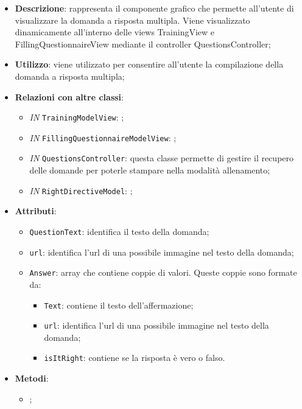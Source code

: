 		\begin{itemize}
			\item \textbf{Descrizione}: rappresenta il componente grafico che permette all'utente di visualizzare la domanda a risposta multipla. Viene visualizzato dinamicamente all'interno delle views TrainingView e FillingQuestionnaireView mediante il controller QuestionsController;
			\item \textbf{Utilizzo}: viene utilizzato per consentire all'utente la compilazione della domanda a risposta multipla;
			\item \textbf{Relazioni con altre classi}: 
			\begin{itemize}
				\item \textit{IN} \texttt{TrainingModelView}: ; 
				\item \textit{IN} \texttt{FillingQuestionnaireModelView}: ;
				\item \textit{IN} \texttt{QuestionsController}: questa classe permette di gestire il recupero delle domande per poterle stampare nella modalità allenamento;
				\item \textit{IN} \texttt{RightDirectiveModel}: ;
			\end{itemize}
			\item \textbf{Attributi}: 
			\begin{itemize}
				\item \texttt{QuestionText}: identifica il testo della domanda;
				\item \texttt{url}: identifica l'url di una possibile immagine nel testo della domanda;
				\item \texttt{Answer}: array che contiene coppie di valori. Queste coppie sono formate da:
				\begin{itemize}
					\item \texttt{Text}: contiene il testo dell'affermazione;
					\item \texttt{url}: identifica l'url di una possibile immagine nel testo della domanda;
					\item \texttt{isItRight}: contiene se la risposta è vero o falso.
				\end{itemize}
			\end{itemize}
			 
			\item \textbf{Metodi}: 
			\begin{itemize}
				\item ;
			\end{itemize}
		\end{itemize}
		
